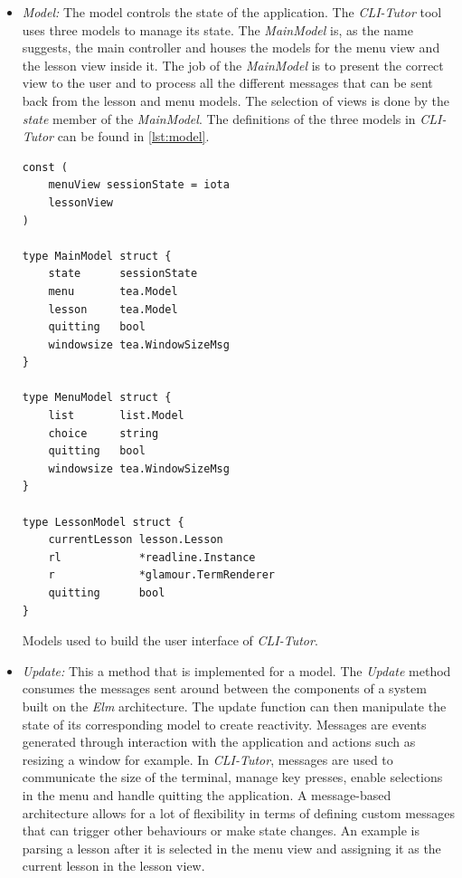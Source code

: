\begin{itemize}
    \item \textit{Model:} The model controls the state of the application. The 
        \textit{CLI-Tutor} tool uses three models to manage its state. The
        \textit{MainModel} is, as the name suggests, the main controller and
        houses the models for the menu view and the lesson view inside it. The
        job of the \textit{MainModel} is to present the correct view to the
        user and to process all the different messages that can be sent back
        from the lesson and menu models. The selection of views is done by the \textit{state} member of the \textit{MainModel}.  The definitions of the three models in \textit{CLI-Tutor} can be found in \autoref{lst:model}.

\begin{listing}
\begin{verbatim}
const (
	menuView sessionState = iota
	lessonView
)

type MainModel struct {
	state      sessionState
	menu       tea.Model
	lesson     tea.Model
	quitting   bool
	windowsize tea.WindowSizeMsg
}

type MenuModel struct {
	list       list.Model
	choice     string
	quitting   bool
	windowsize tea.WindowSizeMsg
}

type LessonModel struct {
	currentLesson lesson.Lesson
	rl            *readline.Instance
	r             *glamour.TermRenderer
	quitting      bool
}
\end{verbatim}
    \caption{Models used to build the user interface of \textit{CLI-Tutor}.}
    \label{lst:model}
\end{listing}

\item \textit{Update:} This a method that is implemented for a model. The
    \textit{Update} method consumes the messages sent around between the
    components of a system built on the \textit{Elm} architecture. The update
    function can then manipulate the state of its corresponding model to
    create reactivity. Messages are events generated through interaction with
    the application and actions such as resizing a window for example. In
    \textit{CLI-Tutor}, messages are used to communicate the size of the
    terminal, manage key presses, enable selections in the menu and handle
    quitting the application. A message-based architecture allows for a lot of
    flexibility in terms of defining custom messages that can trigger other
    behaviours or make state changes. An example is parsing a lesson after it
    is selected in the menu view and assigning it as the current lesson in the
    lesson view.


\end{itemize}
